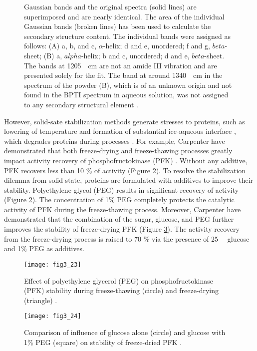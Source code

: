 \begin{refsection}
\begin{figure}[htbp]
{    Gaussian bands and the original spectra (solid lines) are superimposed and
    are nearly identical. The area of the individual Gaussian bands (broken
    lines) has been used to calculate the secondary structure content. The
    individual bands were assigned as follows: (A) a, b, and c, $\alpha$-helix;
    d and e, unordered; f and g, $beta$-sheet; (B) a, $alpha$-helix; b and c,
    unordered; d and e, $beta$-sheet. The bands at \SI{1205}{\per\cm}  are not
    an amide III vibration and are presented solely for the fit. The band at
    around \SI{1340}{\per\cm} in the spectrum of the powder (B), which is of an
unknown origin and not found in the BPTI spectrum in aqueous solution, was not
assigned to any secondary structural element \cite{Griebenow1995}.}
    \label{fig:lyo}
\end{figure}

However, solid-sate stabilization methods generate stresses to proteins, such
as lowering of temperature and formation of substantial ice-aqueous interface
\cite{Luthra2007}, which degrades proteins during processes \cite{Taylor2010}.
For example, Carpenter  have demonstrated that both freeze-drying
and freeze-thawing processes greatly impact activity recovery of
phosphofructokinase (PFK) \cite{Carpenter1993}.  Without any additive, PFK
recovers less than 10 \% of activity \cite{Carpenter1993} (Figure
\ref{fig:pfk}). To resolve the stabilization dilemma from solid state, proteins
are formulated with additives to improve their stability.  Polyethylene
glycol (PEG) results in significant recovery of activity (Figure
\ref{fig:pfk}).  The concentration of 1\% PEG completely protects the
catalytic activity of PFK during the freeze-thawing process.  Moreover,
Carpenter  have demonstrated that the combination of the sugar,
glucose, and PEG further improves the stability of freeze-drying PFK (Figure
\ref{fig:pfk2}). The activity recovery from the freeze-drying process is raised
to 70 \% via the presence of \SI{25}{\milli\Molar} glucose and 1\% PEG as
additives. 
\begin{figure}[htbp] \centering \texttt{[image: fig3\_23]}
    \caption[Effect of polyethylene glycol (PEG) on phosphofructokinase (PFK) stability
    during freeze-thawing (circle) and freeze-drying (triangle).] {Effect of
        polyethylene glycerol (PEG) on phosphofructokinase (PFK) stability during
        freeze-thawing (circle) and freeze-drying (triangle)
        \cite{Carpenter1993}.} 
    \label{fig:pfk}
\end{figure}
\begin{figure}[htbp] \centering \texttt{[image: fig3\_24]}
    \caption[Comparison of influence of glucose alone (circle) and glucose with
    1\% PEG (square) on stability of freeze-dried PFK.]{Comparison of influence
        of glucose alone (circle) and glucose with 1\% PEG (square) on
        stability of freeze-dried PFK \cite{Carpenter1993}.} \label{fig:pfk2}
    \end{figure}


\end{refsection}
